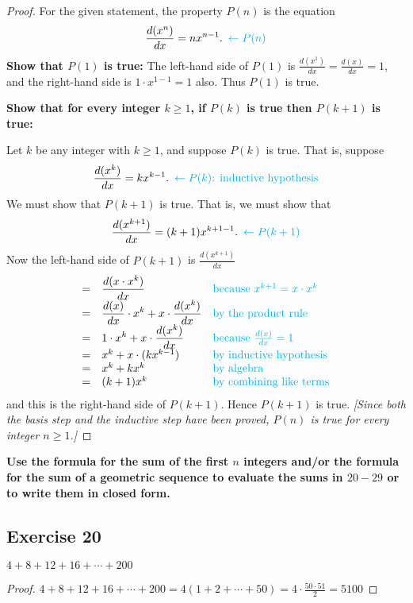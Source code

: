 \documentclass[14pt]{extarticle}
\newcommand{\dps}{\displaystyle}
\newcommand{\from}{\leftarrow}
\newcommand{\cy}{\color{cyan}}
\begin{document}
\begin{proof}
For the given statement, the property $P(n)$ is the equation
\[
\dps \frac{d(x^n)}{dx} = n x^{n-1}. \,\,\, {\cy \from P(n)}
\]
{\bf Show that $P(1)$ is true:} The left-hand side of $P(1)$ is $\dps \frac{d(x^1)}{dx} = \frac{d(x)}{dx} = 1$, and the right-hand side is $1 \cdot x^{1-1} = 1$ also. Thus $P(1)$ is true.

{\bf Show that for every integer $k \geq 1$, if $P(k)$ is true then $P(k + 1)$ is true:}

Let $k$ be any integer with $k \geq 1$, and suppose $P(k)$ is true. That is, suppose
\[
\dps \frac{d(x^k)}{dx} = k x^{k-1}. \,\,\, {\cy \from P(k) \text{: inductive hypothesis}}
\]
We must show that $P(k + 1)$ is true. That is, we must show that
\[
\dps \frac{d(x^{k+1})}{dx} = (k+1) x^{k+1-1}. \,\,\,{\cy \from P(k+1)}
\]
Now the left-hand side of $P(k+1)$ is $\dps \frac{d(x^{k+1})}{dx}$
\[
\begin{array}{lll}
= & \dps \frac{d(x\cdot x^k)}{dx} & \text{\cy because $x^{k+1} = x\cdot x^k$} \\
= & \dps \frac{d(x)}{dx}\cdot x^k + x\cdot\frac{d(x^k)}{dx} & \text{\cy by the product rule} \\
= & \dps 1 \cdot x^k + x\cdot\frac{d(x^k)}{dx} & \text{\cy because $\frac{d(x)}{dx} = 1$} \\
= & x^k + x\cdot(k x^{k-1}) & \text{\cy by inductive hypothesis} \\
= & x^k + kx^k & \text{\cy by algebra} \\
= & (k+1)x^k & \text{\cy by combining like terms}
\end{array}
\]
and this is the right-hand side of $P(k + 1)$. Hence $P(k + 1)$ is true. {\it [Since both the basis step and the inductive step have been proved, $P(n)$ is true for every integer $n \geq 1$.]}
\end{proof}

{\bf \cy Use the formula for the sum of the first $n$ integers and/or the formula for the sum of a geometric sequence to evaluate the sums in $20-29$ or to write them in closed form.}

\subsection{Exercise 20}
$4 + 8 + 12 + 16 + \cdots + 200$

\begin{proof}
$\dps 4 + 8 + 12 + 16 + \cdots + 200 = 4(1+2+\cdots+50) = 4 \cdot \frac{50 \cdot 51}{2} = 5100$
\end{proof}
\end{document}
